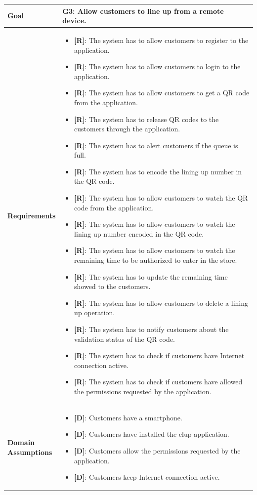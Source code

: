 \begin{table}[H]
\centering
\begin{tabular}{| m{} | m{} |} 
	\hline
	\textbf{Goal} &
		\textbf{G3: Allow customers to line up from a remote device.} \\
	\hline
	\textbf{Requirements} &
		\begin{itemize}
			\item {\textbf{[R]}}: The system has to allow customers to register to the application.
			\item {\textbf{[R]}}: The system has to allow customers to login to the application.
			\item {\textbf{[R]}}: The system has to allow customers to get a QR code from the application.
			\item {\textbf{[R]}}: The system has to release QR codes to the customers through the application.
			\item {\textbf{[R]}}: The system has to alert customers if the queue is full.
			\item {\textbf{[R]}}: The system has to encode the lining up number in the QR code.
			\item {\textbf{[R]}}: The system has to allow customers to watch the QR code from the application.
			\item {\textbf{[R]}}: The system has to allow customers to watch the lining up number encoded in the QR code.
			\item {\textbf{[R]}}: The system has to allow customers to watch the remaining time to be authorized to enter in the store.
			\item {\textbf{[R]}}: The system has to update the remaining time showed to the customers.
			\item {\textbf{[R]}}: The system has to allow customers to delete a lining up operation.
			\item {\textbf{[R]}}: The system has to notify customers about the validation status of the QR code.
			\item {\textbf{[R]}}: The system has to check if customers have Internet connection active.
			\item {\textbf{[R]}}: The system has to check if customers have allowed the permissions requested by the application.
		\end{itemize} \\ 
	\hline
	\shortstack[l]{\textbf{Domain} \\ \textbf{Assumptions}} & 
		\begin{itemize}
			\item {\textbf{[D]}}: Customers have a smartphone.
			\item {\textbf{[D]}}: Customers have installed the \gls{clup} application.
			\item {\textbf{[D]}}: Customers allow the permissions requested by the application.
			\item {\textbf{[D]}}: Customers keep Internet connection active.
		\end{itemize} \\ 
	\hline
\end{tabular}
\end{table}

